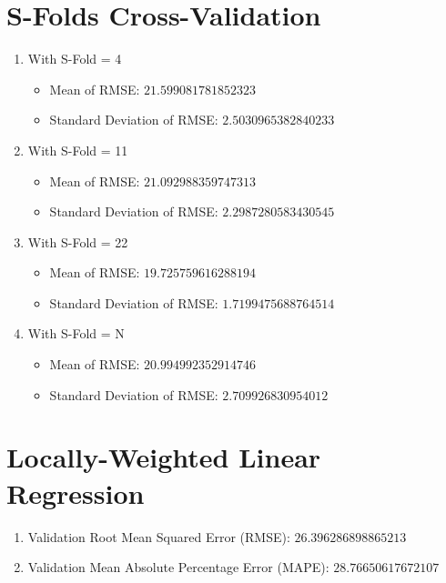 \documentclass[12pt]{article}
\begin{document}
\section{S-Folds Cross-Validation}\label{linreg}

\begin{enumerate}
   \item With S-Fold = 4
   \begin{itemize}
     \item Mean of RMSE: $21.599081781852323$
     \item Standard Deviation of RMSE: $2.5030965382840233$
   \end{itemize}
   
   \item With S-Fold = 11
   \begin{itemize}
     \item Mean of RMSE: $21.092988359747313$
     \item Standard Deviation of RMSE: $2.2987280583430545$
   \end{itemize}
   
   \item With S-Fold = 22
   \begin{itemize}
     \item Mean of RMSE: $19.725759616288194$
     \item Standard Deviation of RMSE: $1.7199475688764514$
   \end{itemize}
   
   \item With S-Fold = N
   \begin{itemize}
     \item Mean of RMSE: $20.994992352914746$
     \item Standard Deviation of RMSE: $2.709926830954012$
   \end{itemize}
\end{enumerate}

\section{Locally-Weighted Linear Regression}
\begin{enumerate}
    \item Validation Root Mean Squared Error (RMSE): $26.396286898865213$
    \item Validation Mean Absolute Percentage Error (MAPE): $28.76650617672107$
\end{enumerate}
\end{document}
